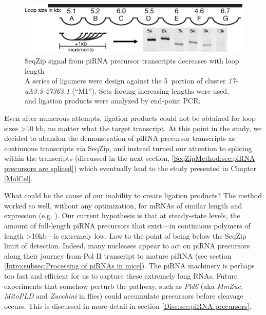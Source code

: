     \begin{figure} %
      \centering
      \includegraphics{Figures/SeqZipMethod/piRNAprecusorM1SignalDecreasesWithLoopLength.eps}
      \caption[SeqZip signal from piRNA precursor transcripts decreases with loop length]
      {
        SeqZip signal from piRNA precursor transcripts decreases with loop length\\[0.25cm]
        A series of ligamers were design against the 5\textprime~portion of cluster \textit{17-qA3.3-27363.1} (``M1''). Sets forcing increasing lengths were used, and ligation products were analyzed by end-point PCR.
        }
      \label{SeqZipMethod:fig:piRNA precusors and loop length}
      \end{figure}

    Even after numerous attempts, ligation products could not be obtained for loop sizes >10 kb, no matter what the target transcript. At this point in the study, we decided to abandon the demonstration of piRNA precursor transcripts as continuous transcripts via SeqZip, and instead turned our attention to splicing within the transcripts (discussed in the next section, \ref{SeqZipMethod:sec:piRNA precursors are spliced}) which eventually lead to the study presented in Chapter \ref{MolCel}.

    What could be the cause of our inability to create ligation products? The method worked so well, without any optimization, for mRNAs of similar length and expression (e.g. \dst{}). Our current hypothesis is that at steady-state levels, the amount of full-length piRNA precursors that exist---in continuous polymers of length >10kb---is extremely low. Low to the point of being below the SeqZip limit of detection. Indeed, many nucleases appear to act on piRNA precursors along their journey from Pol II transcript to mature piRNA (see section \ref{Intro:subsec:Processing of piRNAs in mice}). The piRNA machinery is perhaps too fast and efficient for us to capture these extremely long RNAs. Future experiments that somehow perturb the pathway, such as \textit{Pld6} (aka \textit{MmZuc, MitoPLD} and \textit{Zucchini} in flies) could accumulate precursors before cleavage occurs. This is discussed in more detail in section \ref{Disc:sec:piRNA precursors}.

